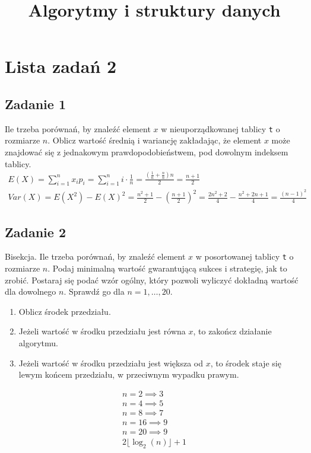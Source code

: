\documentclass{article}
\begin{document}
\title{Algorytmy i struktury danych}
\author{}
\date{}
\maketitle

\section*{Lista zadań 2}

\subsection*{Zadanie 1}
Ile trzeba porównań, by znaleźć element $x$ w nieuporządkowanej tablicy \verb|t| o rozmiarze
$n$. Oblicz wartość średnią i wariancję zakładając, że element $x$ może znajdować się z
jednakowym prawdopodobieństwem, pod dowolnym indeksem tablicy.
\begin{gather*}
    E(X) = \sum_{i=1}^{n} x_ip_i = \sum_{i=1}^{n} i \cdot \frac{1}{n} = \frac{\left(\frac{1}{n}+\frac{n}{n}\right)n}{2} = \frac{n+1}{2} \\
    Var(X) = E(X^2) - E(X)^2 = \frac{n^2+1}{2} - \left(\frac{n+1}{2}\right)^2 = \frac{2n^2+2}{4} - \frac{n^2+2n+1}{4} = \frac{(n-1)^2}{4}
\end{gather*}

\subsection*{Zadanie 2}
Bisekcja. Ile trzeba porównań, by znaleźć element $x$ w posortowanej tablicy \verb|t| o rozmiarze
$n$. Podaj minimalną wartość gwarantującą sukces i strategię, jak to zrobić. Postaraj się
podać wzór ogólny, który pozwoli wyliczyć dokładną wartość dla dowolnego $n$. Sprawdź go dla $n = 1, \dots, 20$.
\begin{enumerate}
    \item Oblicz środek przedziału.
    \item Jeżeli wartość w środku przedziału jest równa $x$, to zakończ działanie algorytmu.
    \item Jeżeli wartość w środku przedziału jest większa od $x$, to środek staje się lewym końcem przedziału,
          w przeciwnym wypadku prawym.
\end{enumerate}
\begin{gather*}
    n=2 \implies 3 \\
    n=4 \implies 5 \\
    n=8 \implies 7 \\
    n=16 \implies 9 \\
    n=20 \implies 9 \\
    2 \lfloor \log_2(n) \rfloor + 1
\end{gather*}
\end{document}
